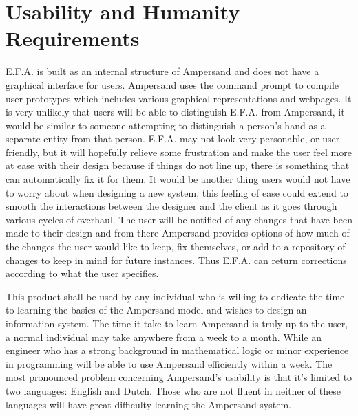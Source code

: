 \documentclass[12pt]{report}
\begin{document}
\section{Usability and Humanity Requirements}\label{sec:Usability}
E.F.A. is built as an internal structure of Ampersand and does not have a graphical interface for 
users. Ampersand uses the command prompt to compile user prototypes which includes various 
graphical representations and webpages. It is very unlikely that users will be able to distinguish 
E.F.A. from Ampersand, it would be similar to someone attempting to distinguish a person’s hand as 
a separate entity from that person. E.F.A. may not look very personable, or user friendly, but it 
will hopefully relieve some frustration and make the user feel more at ease with their design 
because if things do not line up, there is something that can automatically fix it for them. It 
would be another thing users would not have to worry about when designing a new system, this 
feeling of ease could extend to smooth the interactions between the designer and the client as it 
goes through various cycles of overhaul. The user will be notified of any changes that have been 
made to their design and from there Ampersand provides options of how much of the changes the user 
would like to keep, fix themselves, or add to a repository of changes to keep in mind for future 
instances. Thus E.F.A. can return corrections according to what the user specifies.

This product shall be used by any individual who is willing to dedicate the time to learning the 
basics of the Ampersand model and wishes to design an information system. The time it take to learn 
Ampersand is truly up to the user, a normal individual may take anywhere from a week to a month. 
While an engineer who has a strong background in mathematical logic or minor experience in 
programming will be able to use Ampersand efficiently within a week. The most pronounced problem 
concerning Ampersand’s usability is that it’s limited to two languages: English and Dutch. Those 
who are not fluent in neither of these languages will have great difficulty learning the Ampersand 
system.
\end{document}
